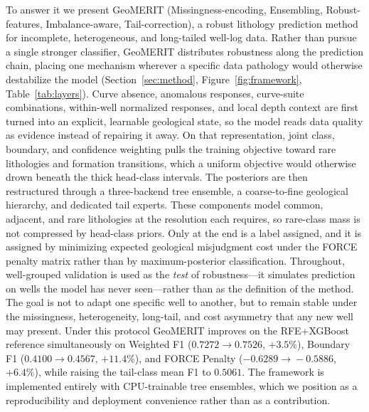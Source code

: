 \documentclass[bdcc,article,submit,pdftex,moreauthors]{Definitions/mdpi}
\begin{document}
To answer it we present GeoMERIT (Missingness-encoding, Ensembling, Robust-features,
Imbalance-aware, Tail-correction), a robust lithology prediction method for incomplete,
heterogeneous, and long-tailed well-log data. Rather than pursue a single stronger
classifier, GeoMERIT distributes robustness along the prediction chain, placing one mechanism
wherever a specific data pathology would otherwise destabilize the model
(Section~\ref{sec:method}, Figure~\ref{fig:framework}, Table~\ref{tab:layers}). Curve absence,
anomalous responses, curve-suite combinations, within-well normalized responses, and local
depth context are first turned into an explicit, learnable geological state, so the model
reads data quality as evidence instead of repairing it away. On that representation, joint
class, boundary, and confidence weighting pulls the training objective toward rare lithologies
and formation transitions, which a uniform objective would otherwise drown beneath the thick
head-class intervals. The posteriors are then restructured through a three-backend tree ensemble, a
coarse-to-fine geological hierarchy, and dedicated tail experts. These components model
common, adjacent, and rare lithologies at the resolution each requires, so rare-class mass is
not compressed by head-class priors. Only at the end is a label assigned, and it is assigned by minimizing
expected geological misjudgment cost under the FORCE penalty matrix rather than by
maximum-posterior classification. Throughout, well-grouped validation is used as the
\emph{test} of robustness---it simulates prediction on wells the model has never seen---rather
than as the definition of the method. The goal is not to adapt one specific well to another,
but to remain stable under the missingness, heterogeneity, long-tail, and cost asymmetry that
any new well may present. Under this protocol GeoMERIT improves on the RFE+XGBoost reference
simultaneously on Weighted F1 ($0.7272\!\to\!0.7526$, $+3.5\%$), Boundary F1
($0.4100\!\to\!0.4567$, $+11.4\%$), and FORCE Penalty ($-0.6289\!\to\!-0.5886$, $+6.4\%$),
while raising the tail-class mean F1 to $0.5061$. The framework is implemented entirely with
CPU-trainable tree ensembles, which we position as a reproducibility and deployment
convenience rather than as a contribution.
\end{document}
